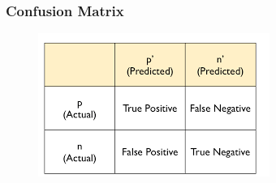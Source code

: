 \documentclass[PredictiveAnalytics101.tex]{subfiles}
\begin{document}
 

\begin{frame}
\frametitle{Confusion Matrix}

	\begin{figure}
\centering
\includegraphics[width=0.99\linewidth]{confusionmatrix2}
\end{figure}

\end{frame}
\end{document}
